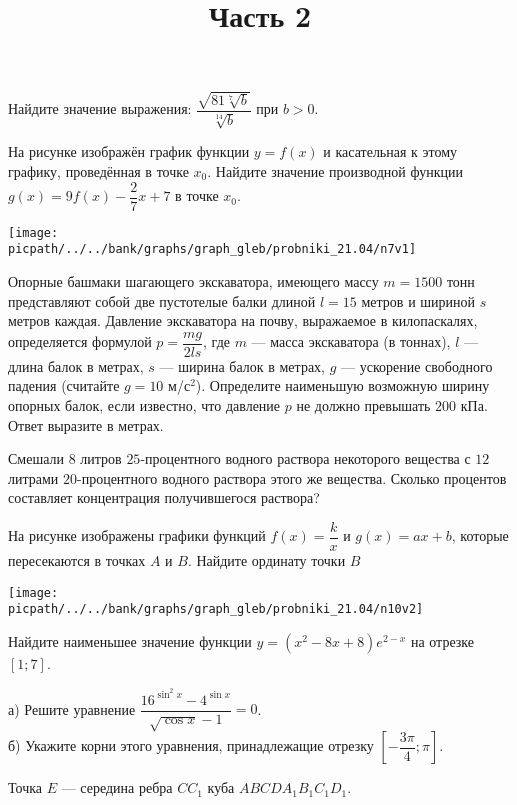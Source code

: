 \begin{training}[2]
\begin{listofex}
		\item Найдите значение выражения: \( \dfrac{\sqrt{81\sqrt[7]{b}}}{\sqrt[14]{b}} \) при \( b>0 \).
		\foranswer
		\item
		На рисунке изображён график функции \( y=f(x) \) и касательная к этому графику, проведённая в точке \( x_0 \). Найдите значение производной функции \( g(x)=9f(x)-\dfrac{2}{7}x+7 \) в точке \( x_0 \).
		\begin{center}
			\texttt{[image: \\picpath/../../bank/graphs/graph\_gleb/probniki\_21.04/n7v1]}
		\end{center}
		\foranswer
		\hphantom{Часть 1}
		\newpage
		\item Опорные башмаки шагающего экскаватора, имеющего массу \( m=1500 \) тонн представляют собой две пустотелые балки длиной \( l=15 \) метров и шириной \( s \) метров каждая. Давление экскаватора на почву, выражаемое в килопаскалях, определяется формулой \( p=\dfrac{mg}{2ls} \), где \( m \) --- масса экскаватора (в тоннах), \( l \) ---длина балок в метрах, \( s \) --- ширина балок в метрах, \( g \) --- ускорение свободного падения (считайте \( g=10 \) м/с\( ^2 \)). Определите наименьшую возможную ширину опорных балок, если известно, что давление \( p \) не должно превышать \( 200 \) кПа. Ответ выразите в метрах.
		\foranswer
		\item Смешали \( 8 \) литров \( 25 \)-процентного водного раствора некоторого вещества с \( 12 \) литрами \( 20 \)-процентного водного раствора этого же вещества. Сколько процентов составляет концентрация получившегося раствора?
		\foranswer
		\item 
		На рисунке изображены графики функций \( f(x)=\dfrac{k}{x} \) и \( g(x)=ax+b \), которые пересекаются в точках \( A \) и \( B \). Найдите ординату точки \( B \)
		\begin{center}
			\texttt{[image: \\picpath/../../bank/graphs/graph\_gleb/probniki\_21.04/n10v2]}
		\end{center}
		\foranswer
		\item Найдите наименьшее значение функции \( y=(x^2-8x+8)e^{2-x} \) на отрезке \( \left[ 1; 7\right]  \).
		\foranswer
		\egepreambtwo
		\title{Часть 2}
		\item а) Решите уравнение \( \dfrac{16^{\sin^2x}-4^{\sin x}}{\sqrt{\cos x}-1}=0\). \\
		б) Укажите корни этого уравнения, принадлежащие отрезку \( \left[ -\dfrac{3\pi}{4};\pi \right]  \).
		\item Точка \( E \) --- середина ребра \( CC_1 \) куба \( ABCDA_1B_1C_1D_1 \). \\

\end{listofex}
\end{training}
